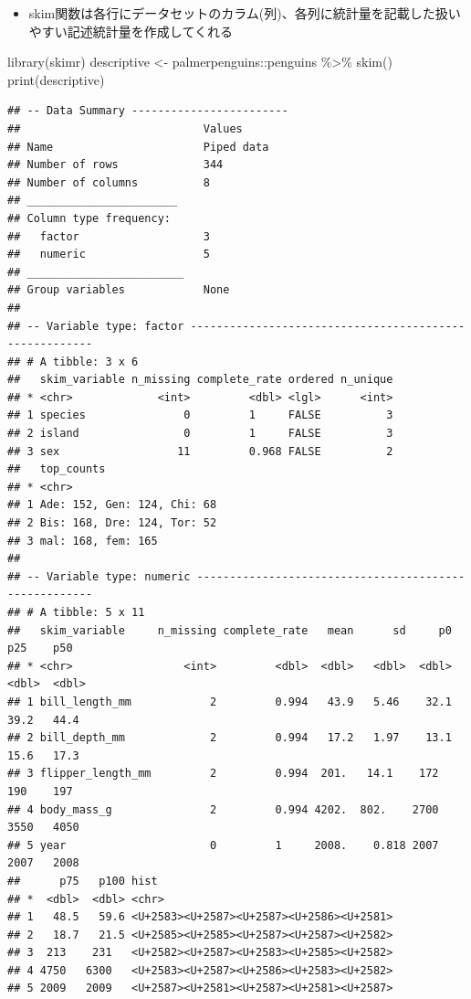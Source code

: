 \documentclass[
]{ltjsarticle}
\newenvironment{Shaded}{\begin{snugshade}}{\end{snugshade}}
\newcommand{\FunctionTok}[1]{\textcolor[rgb]{0.00,0.00,0.00}{#1}}
\newcommand{\NormalTok}[1]{#1}
\newcommand{\OtherTok}[1]{\textcolor[rgb]{0.56,0.35,0.01}{#1}}
\newcommand{\SpecialCharTok}[1]{\textcolor[rgb]{0.00,0.00,0.00}{#1}}
\providecommand{\tightlist}{%
  \setlength{\itemsep}{0pt}\setlength{\parskip}{0pt}}
\begin{document}
\begin{itemize}
\tightlist
\item
  skim関数は各行にデータセットのカラム(列)、各列に統計量を記載した扱いやすい記述統計量を作成してくれる
\end{itemize}

\begin{Shaded}
\begin{Highlighting}[]
\FunctionTok{library}\NormalTok{(skimr)}
\NormalTok{descriptive }\OtherTok{\textless{}{-}}\NormalTok{ palmerpenguins}\SpecialCharTok{::}\NormalTok{penguins }\SpecialCharTok{\%\textgreater{}\%}
  \FunctionTok{skim}\NormalTok{()}
\FunctionTok{print}\NormalTok{(descriptive)}
\end{Highlighting}
\end{Shaded}

\begin{verbatim}
## -- Data Summary ------------------------
##                            Values    
## Name                       Piped data
## Number of rows             344       
## Number of columns          8         
## _______________________              
## Column type frequency:               
##   factor                   3         
##   numeric                  5         
## ________________________             
## Group variables            None      
## 
## -- Variable type: factor -------------------------------------------------------
## # A tibble: 3 x 6
##   skim_variable n_missing complete_rate ordered n_unique
## * <chr>             <int>         <dbl> <lgl>      <int>
## 1 species               0         1     FALSE          3
## 2 island                0         1     FALSE          3
## 3 sex                  11         0.968 FALSE          2
##   top_counts                 
## * <chr>                      
## 1 Ade: 152, Gen: 124, Chi: 68
## 2 Bis: 168, Dre: 124, Tor: 52
## 3 mal: 168, fem: 165         
## 
## -- Variable type: numeric ------------------------------------------------------
## # A tibble: 5 x 11
##   skim_variable     n_missing complete_rate   mean      sd     p0    p25    p50
## * <chr>                 <int>         <dbl>  <dbl>   <dbl>  <dbl>  <dbl>  <dbl>
## 1 bill_length_mm            2         0.994   43.9   5.46    32.1   39.2   44.4
## 2 bill_depth_mm             2         0.994   17.2   1.97    13.1   15.6   17.3
## 3 flipper_length_mm         2         0.994  201.   14.1    172    190    197  
## 4 body_mass_g               2         0.994 4202.  802.    2700   3550   4050  
## 5 year                      0         1     2008.    0.818 2007   2007   2008  
##      p75   p100 hist 
## *  <dbl>  <dbl> <chr>
## 1   48.5   59.6 <U+2583><U+2587><U+2587><U+2586><U+2581>
## 2   18.7   21.5 <U+2585><U+2585><U+2587><U+2587><U+2582>
## 3  213    231   <U+2582><U+2587><U+2583><U+2585><U+2582>
## 4 4750   6300   <U+2583><U+2587><U+2586><U+2583><U+2582>
## 5 2009   2009   <U+2587><U+2581><U+2587><U+2581><U+2587>
\end{verbatim}
\end{document}
